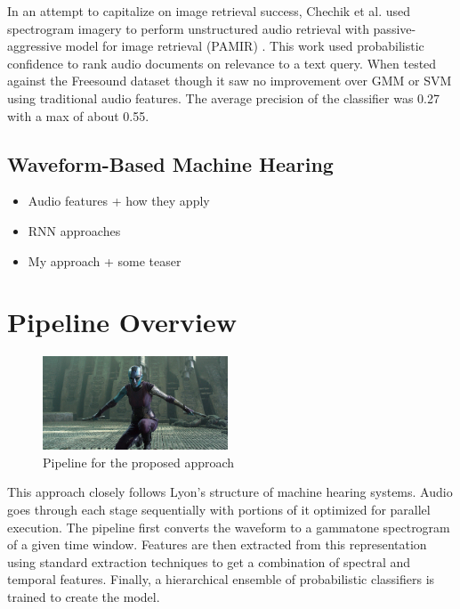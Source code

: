 In an attempt to capitalize on image retrieval success, Chechik et al. used spectrogram imagery to perform unstructured audio retrieval with passive-aggressive model for image retrieval (PAMIR) \cite{Chechik2008}. This work used probabilistic confidence to rank audio documents on relevance to a text query. When tested against the Freesound dataset though it saw no improvement over GMM or SVM using traditional audio features. The average precision of the classifier was 0.27 with a max of about 0.55.

\subsection{Waveform-Based Machine Hearing}
\begin{itemize}
    \item Audio features + how they apply
    \item RNN approaches
    \item My approach + some teaser
\end{itemize}

\section{Pipeline Overview}

\begin{figure}[!h]
    \centering
    \includegraphics[width=0.49\textwidth]{figures/pipeline.jpg}
    \caption{Pipeline for the proposed approach}
    \label{fig:pipeline}
\end{figure}

This approach closely follows Lyon's structure of machine hearing systems. Audio goes through each stage sequentially with portions of it optimized for parallel execution. The pipeline first converts the waveform to a gammatone spectrogram of a given time window. Features are then extracted from this representation using standard extraction techniques to get a combination of spectral and temporal features. Finally, a hierarchical ensemble of probabilistic classifiers is trained to create the model.

